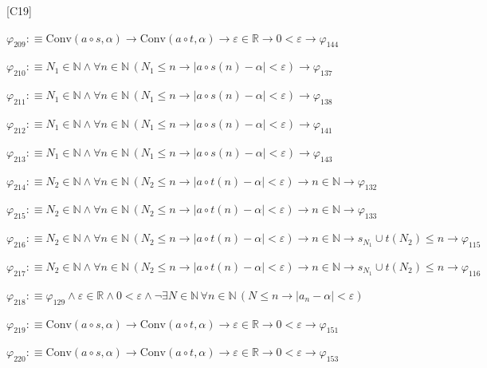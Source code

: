 \begin{fullproof}{[C19]}
\begin{abbrevlist}
\item $\varphi_{209} :\equiv \mathrm{Conv}(a \circ s,\alpha) \to \mathrm{Conv}(a \circ t,\alpha) \to \varepsilon \in \mathbb{R} \to 0 < \varepsilon \to \varphi_{144}$
\item $\varphi_{210} :\equiv N_{1} \in \mathbb{N} \land \forall n \in \mathbb{N}\,(N_{1} \leq n \to \lvert a \circ s(n) - \alpha \rvert < \varepsilon) \to \varphi_{137}$
\item $\varphi_{211} :\equiv N_{1} \in \mathbb{N} \land \forall n \in \mathbb{N}\,(N_{1} \leq n \to \lvert a \circ s(n) - \alpha \rvert < \varepsilon) \to \varphi_{138}$
\item $\varphi_{212} :\equiv N_{1} \in \mathbb{N} \land \forall n \in \mathbb{N}\,(N_{1} \leq n \to \lvert a \circ s(n) - \alpha \rvert < \varepsilon) \to \varphi_{141}$
\item $\varphi_{213} :\equiv N_{1} \in \mathbb{N} \land \forall n \in \mathbb{N}\,(N_{1} \leq n \to \lvert a \circ s(n) - \alpha \rvert < \varepsilon) \to \varphi_{143}$
\item $\varphi_{214} :\equiv N_{2} \in \mathbb{N} \land \forall n \in \mathbb{N}\,(N_{2} \leq n \to \lvert a \circ t(n) - \alpha \rvert < \varepsilon) \to n \in \mathbb{N} \to \varphi_{132}$
\item $\varphi_{215} :\equiv N_{2} \in \mathbb{N} \land \forall n \in \mathbb{N}\,(N_{2} \leq n \to \lvert a \circ t(n) - \alpha \rvert < \varepsilon) \to n \in \mathbb{N} \to \varphi_{133}$
\item $\varphi_{216} :\equiv N_{2} \in \mathbb{N} \land \forall n \in \mathbb{N}\,(N_{2} \leq n \to \lvert a \circ t(n) - \alpha \rvert < \varepsilon) \to n \in \mathbb{N} \to s_{N_{1}} \cup t(N_{2}) \leq n \to \varphi_{115}$
\item $\varphi_{217} :\equiv N_{2} \in \mathbb{N} \land \forall n \in \mathbb{N}\,(N_{2} \leq n \to \lvert a \circ t(n) - \alpha \rvert < \varepsilon) \to n \in \mathbb{N} \to s_{N_{1}} \cup t(N_{2}) \leq n \to \varphi_{116}$
\item $\varphi_{218} :\equiv \varphi_{129} \land \varepsilon \in \mathbb{R} \land 0 < \varepsilon \land \neg \exists N \in \mathbb{N}\,\forall n \in \mathbb{N}\,(N \leq n \to \lvert a_{n} - \alpha \rvert < \varepsilon)$
\item $\varphi_{219} :\equiv \mathrm{Conv}(a \circ s,\alpha) \to \mathrm{Conv}(a \circ t,\alpha) \to \varepsilon \in \mathbb{R} \to 0 < \varepsilon \to \varphi_{151}$
\item $\varphi_{220} :\equiv \mathrm{Conv}(a \circ s,\alpha) \to \mathrm{Conv}(a \circ t,\alpha) \to \varepsilon \in \mathbb{R} \to 0 < \varepsilon \to \varphi_{153}$

\end{abbrevlist}
\end{fullproof}
